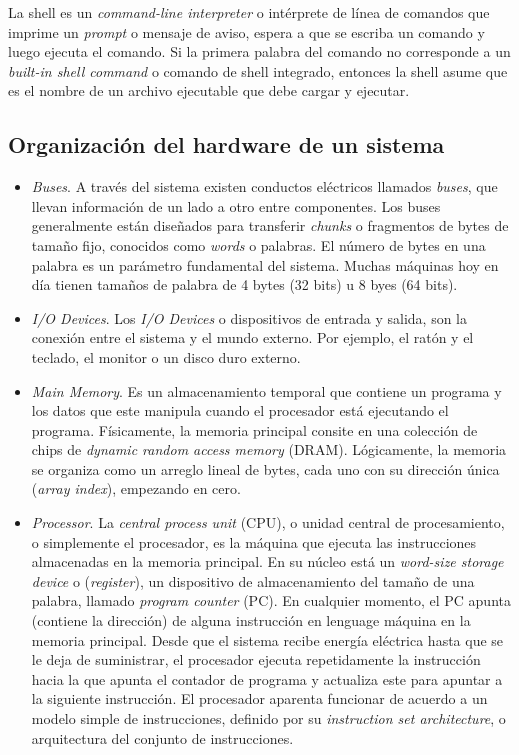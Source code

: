 La shell es un \textit{command-line interpreter} o intérprete de línea de comandos que imprime un \textit{prompt} o mensaje de aviso, espera a que se escriba un comando y luego ejecuta el comando. Si la primera palabra del comando no corresponde a un \textit{built-in shell command} o comando de shell integrado, entonces la shell asume que es el nombre de un archivo ejecutable que debe cargar y ejecutar.

\subsection{Organización del hardware de un sistema}

\begin{itemize}
\item \textit{Buses}. A través del sistema existen conductos eléctricos llamados \textit{buses}, que llevan información de un lado a otro entre componentes. Los buses generalmente están diseñados para transferir \textit{chunks} o fragmentos de bytes de tamaño fijo, conocidos como \textit{words} o palabras. El número de bytes en una palabra es un parámetro fundamental del sistema. Muchas máquinas hoy en día tienen tamaños de palabra de 4 bytes (32 bits) u 8 byes (64 bits).
\item \textit{I/O Devices}. Los \textit{I/O Devices} o dispositivos de entrada y salida, son la conexión entre el sistema y el mundo externo. Por ejemplo, el ratón y el teclado, el monitor o un disco duro externo.
\item \textit{Main Memory}. Es un almacenamiento temporal que contiene un programa y los datos que este manipula cuando el procesador está ejecutando el programa. Físicamente, la memoria principal consite en una colección de chips de \textit{dynamic random access memory} (DRAM). Lógicamente, la memoria se organiza como un arreglo lineal de bytes, cada uno con su dirección única (\textit{array index}), empezando en cero.
\item \textit{Processor}. La \textit{central process unit} (CPU), o unidad central de procesamiento, o simplemente el procesador, es la máquina que ejecuta las instrucciones almacenadas en la memoria principal. En su núcleo está un \textit{word-size storage device} o (\textit{register}), un dispositivo de almacenamiento del tamaño de una palabra, llamado \textit{program counter} (PC). En cualquier momento, el PC apunta (contiene la dirección) de alguna instrucción en lenguage máquina en la memoria principal. Desde que el sistema recibe energía eléctrica hasta que se le deja de suministrar, el procesador ejecuta repetidamente la instrucción hacia la que apunta el contador de programa y actualiza este para apuntar a la siguiente instrucción. El procesador aparenta funcionar de acuerdo a un modelo simple de instrucciones, definido por su \textit{instruction set architecture}, o arquitectura del conjunto de instrucciones. 
\bigskip


\end{itemize}
